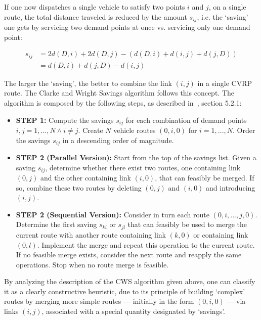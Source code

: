 If one now dispatches a single vehicle to satisfy two points $i$ and $j$, on a 
single route, the total distance traveled is reduced by the amount $s_{ij}$, i.e. 
the `saving' one gets by servicing two demand points at once vs. servicing only 
one demand point:

\begin{equation*}
\begin{split}
s_{ij}  &= 2d(D,i) + 2d(D,j) - (d(D,i) + d(i,j) + d(j,D))\\
        &= d(D,i) + d(j,D) - d(i,j)
\end{split}
\end{equation*}\vertbreak

The larger the `saving', the better to combine the link $(i,j)$ in a single 
CVRP route. The Clarke and Wright Savings algorithm follows this concept. The 
algorithm is composed by the following steps, as described in~\cite{Toth2002}, 
section 5.2.1:

\begin{itemize}

    \item \textbf{STEP 1:} Compute the savings $s_{ij}$ for each combination of 
            demand points $i, j = 1, ..., N \wedge i \neq j$. Create $N$ vehicle 
            routes $(0,i,0)$ for $i = 1, ..., N$. Order the savings $s_{ij}$ in 
            a descending order of magnitude.
    \item \textbf{STEP 2 (Parallel Version):} Start from the top of the 
            savings list. Given a saving $s_{ij}$, determine whether there 
            exist two routes, one containing link $(0,j)$ and the other 
            containing link $(i, 0)$, that can feasibly be merged. If so, 
            combine these two routes by deleting $(0,j)$ and $(i,0)$ and 
            introducing $(i,j)$.
    \item \textbf{STEP 2 (Sequential Version):} Consider in turn each route 
            $(0,i,...,j,0)$. Determine the first saving $s_{ki}$ or $s_{jl}$ 
            that can 
            feasibly be used to merge the current route with another route 
            containing link $(k, 0)$ or containing link $(0, l)$. 
            Implement the merge and repeat this operation to the current route. 
            If no feasible merge exists, consider the next route and reapply 
            the same operations. Stop when no route merge is feasible.
\end{itemize}\vertbreak

By analyzing the description of the CWS algorithm given above, one can classify 
it as a clearly constructive heuristic, due to its principle of building 
`complex' routes by merging more simple routes --- initially in the form 
$(0,i,0)$ --- via links $(i,j)$, associated with a special quantity designated 
by `savings'.

